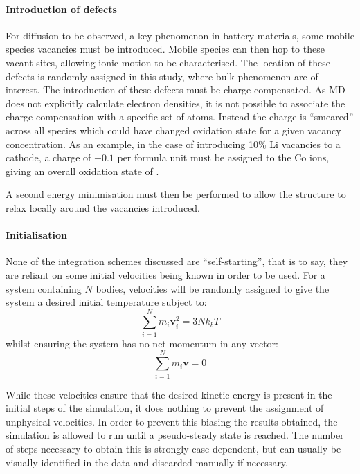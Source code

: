 \paragraph{Introduction of defects}
For diffusion to be observed, a key phenomenon in battery materials, some mobile species vacancies must be introduced.
Mobile species can then hop to these vacant sites, allowing ionic motion to be characterised.
The location of these defects is randomly assigned in this study, where bulk phenomenon are of interest.
The introduction of these defects must be charge compensated.
As MD does not explicitly calculate electron densities, it is not possible to associate the charge compensation with a specific set of atoms.
Instead the charge is ``smeared'' across all species which could have changed oxidation state for a given vacancy concentration.
As an example, in the case of introducing 10\% Li vacancies to a  cathode, a charge of $+0.1$ per formula unit must be assigned to the Co ions, giving an overall oxidation state of .

A second energy minimisation must then be performed to allow the structure to relax locally around the vacancies introduced.

\paragraph{Initialisation}
None of the integration schemes discussed are ``self-starting'', that is to say, they are reliant on some initial velocities being known in order to be used.
For a system containing $N$ bodies, velocities will be randomly assigned to give the system a desired initial temperature subject to:
\begin{equation}
	\sum^N_{i=1}m_i\mathbf{v}_i^2 = 3Nk_bT
	\label{eq:boltz}
\end{equation}
whilst ensuring the system has no net momentum in any vector:
\begin{equation}
	\sum^N_{i=1}m_i\mathbf{v} = 0
\end{equation}

While these velocities ensure that the desired kinetic energy is present in the initial steps of the simulation, it does nothing to prevent the assignment of unphysical velocities.
In order to prevent this biasing the results obtained, the simulation is allowed to run until a pseudo-steady state is reached. 
The number of steps necessary to obtain this is strongly case dependent, but can usually be visually identified in the data and discarded manually if necessary.

